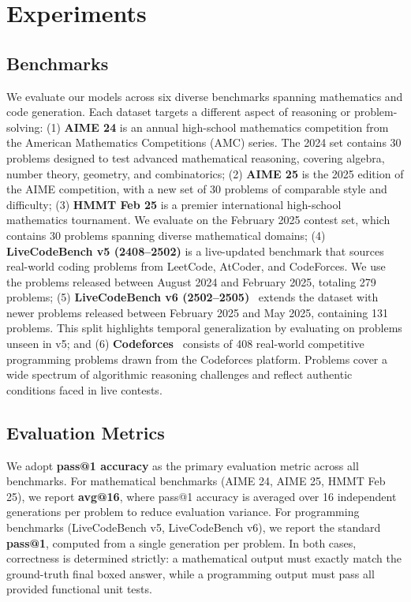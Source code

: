 \section{Experiments}

\subsection{Benchmarks}

We evaluate our models across six diverse benchmarks spanning mathematics and code generation. 
Each dataset targets a different aspect of reasoning or problem-solving: 
(1) \textbf{AIME 24} is an annual high-school mathematics competition from the American Mathematics Competitions (AMC) series. The 2024 set contains 30 problems designed to test advanced mathematical reasoning, covering algebra, number theory, geometry, and combinatorics;
(2) \textbf{AIME 25} is the 2025 edition of the AIME competition, with a new set of 30 problems of comparable style and difficulty;
(3) \textbf{HMMT Feb 25} is a premier international high-school mathematics tournament. We evaluate on the February 2025 contest set, which contains 30 problems spanning diverse mathematical domains;
(4) \textbf{LiveCodeBench v5 (2408–2502)} \citep{jain2024livecodebench} is a live-updated benchmark that sources real-world coding problems from LeetCode, AtCoder, and CodeForces. We use the problems released between August 2024 and February 2025, totaling 279 problems;
(5) \textbf{LiveCodeBench v6 (2502–2505)}~\citep{jain2024livecodebench} extends the dataset with newer problems released between February 2025 and May 2025, containing 131 problems. This split highlights temporal generalization by evaluating on problems unseen in v5;
and (6) \textbf{Codeforces}~\citep{quan2025codeelo} consists of 408 real-world competitive programming problems drawn from the Codeforces platform. Problems cover a wide spectrum of algorithmic reasoning challenges and reflect authentic conditions faced in live contests.  

\subsection{Evaluation Metrics}

We adopt \textbf{pass@1 accuracy} as the primary evaluation metric across all benchmarks. 
For mathematical benchmarks (AIME 24, AIME 25, HMMT Feb 25), we report \textbf{avg@16}, where pass@1 accuracy is averaged over 16 independent generations per problem to reduce evaluation variance. 
For programming benchmarks (LiveCodeBench v5, LiveCodeBench v6), we report the standard \textbf{pass@1}, computed from a single generation per problem. 
In both cases, correctness is determined strictly: a mathematical output must exactly match the ground-truth final boxed answer, while a programming output must pass all provided functional unit tests. 

